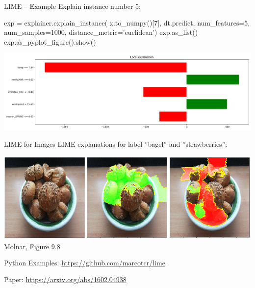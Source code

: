 \documentclass[ignorenonframetext,xcolor=x11names]{beamer}
\begin{document}
\begin{frame}[fragile]{LIME -- Example}
Explain instance number 5:
\begin{pythoncode}
exp = explainer.explain_instance( 
    x.to_numpy()[7], 
    dt.predict, 
    num_features=5, 
    num_samples=1000, 
    distance_metric='euclidean')
exp.as_list()
exp.as_pyplot_figure().show()
\end{pythoncode}

\includegraphics[width=\textwidth]{lime_dt.png}
\end{frame}


        

\begin{frame}{LIME for Images}
LIME explanations for label ''bagel'' and ''strawberries'':
\begin{center}
\includegraphics[width=\textwidth]{molnar-9-8.png} \\

\scriptsize Molnar, Figure 9.8
\end{center}
\begin{block}{Python Examples:}
\url{https://github.com/marcotcr/lime}
\end{block}

\begin{block}{Paper:}
\url{https://arxiv.org/abs/1602.04938}
\end{block}
\end{frame}
\end{document}
